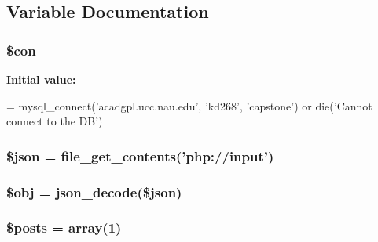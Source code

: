 \subsection{Variable Documentation}
\hypertarget{_p_h_p_put_8php_a0debe10448ec56a57b5509648408a549}{
\subsubsection[{\$con}]{\setlength{\rightskip}{0pt plus 5cm}\$con}}\label{_p_h_p_put_8php_a0debe10448ec56a57b5509648408a549}
{\bfseries Initial value\-:}
\begin{DoxyCode}
= mysql\_connect(\textcolor{stringliteral}{'acadgpl.ucc.nau.edu'}, \textcolor{stringliteral}{'kd268'}, \textcolor{stringliteral}{'capstone'})
        or die('Cannot connect to the DB')
\end{DoxyCode}
\hypertarget{_p_h_p_put_8php_acedd13b51401130848ce18f4d5c52605}{
\subsubsection[{\$json}]{\setlength{\rightskip}{0pt plus 5cm}\$json = file\-\_\-get\-\_\-contents('php\-://input')}}\label{_p_h_p_put_8php_acedd13b51401130848ce18f4d5c52605}
\hypertarget{_p_h_p_put_8php_a9008ed94ba185855b1723e367744b87e}{
\subsubsection[{\$obj}]{\setlength{\rightskip}{0pt plus 5cm}\$obj = json\-\_\-decode(\$json)}}\label{_p_h_p_put_8php_a9008ed94ba185855b1723e367744b87e}
\hypertarget{_p_h_p_put_8php_a9f4cad5a721e7f7711fba0bf0f7ec273}{
\subsubsection[{\$posts}]{\setlength{\rightskip}{0pt plus 5cm}\$posts = array(1)}}\label{_p_h_p_put_8php_a9f4cad5a721e7f7711fba0bf0f7ec273}
